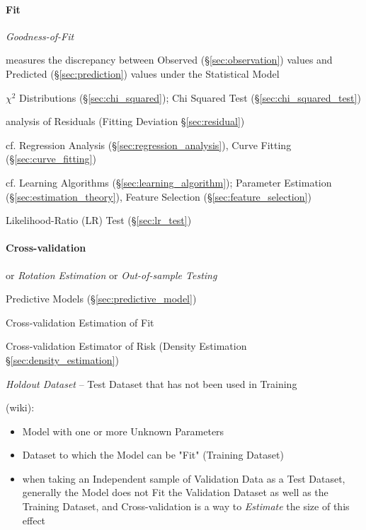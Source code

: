 \paragraph{Fit}\label{sec:model_fit}\hfill

\emph{Goodness-of-Fit}

measures the discrepancy between Observed (\S\ref{sec:observation}) values and
Predicted (\S\ref{sec:prediction}) values under the Statistical Model

$\chi^2$ Distributions (\S\ref{sec:chi_squared});
Chi Squared Test (\S\ref{sec:chi_squared_test})

\fist analysis of Residuals (Fitting Deviation \S\ref{sec:residual})

cf. Regression Analysis (\S\ref{sec:regression_analysis}), Curve Fitting
(\S\ref{sec:curve_fitting})

\fist cf. Learning Algorithms (\S\ref{sec:learning_algorithm});
Parameter Estimation (\S\ref{sec:estimation_theory}), Feature Selection
(\S\ref{sec:feature_selection})

Likelihood-Ratio (LR) Test (\S\ref{sec:lr_test})



\paragraph{Cross-validation}\label{sec:cross_validation}\hfill

or \emph{Rotation Estimation} or \emph{Out-of-sample Testing}

Predictive Models (\S\ref{sec:predictive_model})

Cross-validation Estimation of Fit

Cross-validation Estimator of Risk (Density Estimation
\S\ref{sec:density_estimation})

\emph{Holdout Dataset} -- Test Dataset that has not been used in Training

(wiki):

\begin{itemize}
  \item Model with one or more Unknown Parameters
  \item Dataset to which the Model can be "Fit" (Training Dataset)
  \item when taking an Independent sample of Validation Data as a Test Dataset,
    generally the Model does not Fit the Validation Dataset as well as the
    Training Dataset, and Cross-validation is a way to \emph{Estimate} the size
    of this effect
\end{itemize}

